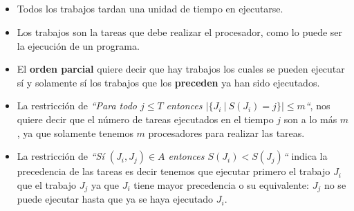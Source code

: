 \documentclass[spanish, xcolor=dvipsnames, aspectratio=169]{beamer}
\newcommand{\subsectiontitle}{}
\begin{document}
\subsection{\subsectiontitle}
\begin{frame}{\subsectiontitle}
\begin{itemize}
    \item Todos los trabajos tardan una unidad de tiempo en ejecutarse.
    \item Los trabajos son la tareas que debe realizar el procesador, como lo puede ser la ejecución de un programa.
    \item El \textbf{orden parcial} quiere decir que hay trabajos los cuales se pueden ejecutar sí y solamente sí los trabajos que los \textbf{preceden} ya han sido ejecutados.
\end{itemize}
\end{frame}
\begin{frame}{\subsectiontitle}
    \begin{itemize}
        \item La restricción de \textit{``Para todo \(j \leq T \) entonces \(|\{J_{i} \ | \ S\left(J_{i}\right) = j\}| \leq m\)``}, nos quiere decir que el número de tareas ejecutados en el tiempo \(j\) son a lo más \(m\), ya que solamente tenemos \(m\) procesadores para realizar las tareas.
        \item La restricción de \textit{``Sí \(\left(J_{i}, J_{j}\right) \in A\) entonces \(S\left(J_{i}\right) < S\left(J_{j}\right)\)``} indica la precedencia de las tareas es decir tenemos que ejecutar primero el trabajo \(J_{i}\) que el trabajo \(J_{j}\) ya que \(J_{i}\) tiene mayor precedencia o su equivalente: \(J_{j}\) no se puede ejecutar hasta que ya se haya ejecutado \(J_{i}\). 
    \end{itemize}
\end{frame}
\renewcommand{\subsectiontitle}{Algoritmo no determinista}
\end{document}
